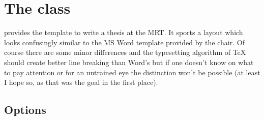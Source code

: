 \chapter{The  class}
 provides the template to write a thesis at the MRT. It sports a
layout which looks confusingly similar to the MS Word template provided by the
chair. Of course there are some minor differences and the typesetting algorithm
of TeX should create better line breaking than Word's but if one doesn't know on
what to pay attention or for an untrained eye the distinction won't be possible
(at least I hope so, as that was the goal in the first place).

\section{Options}%
